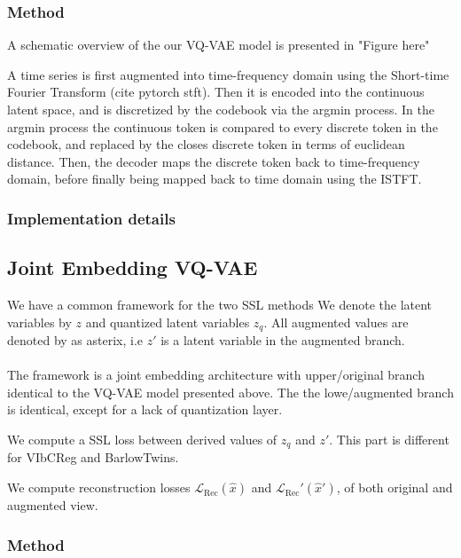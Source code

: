 \documentclass[../../thesis.tex]{subfiles}
\begin{document}
\subsubsection{Method}
A schematic overview of the our VQ-VAE model is presented in "Figure here"\newline

A time series is first augmented into time-frequency domain using the Short-time Fourier Transform (cite pytorch stft). Then it is encoded into the continuous latent space, and is discretized by the codebook via the argmin process. In the argmin process the continuous token is compared to every discrete token in the codebook, and replaced by the closes discrete token in terms of euclidean distance. Then, the decoder maps the discrete token back to time-frequency domain, before finally being mapped back to time domain using the ISTFT.




\subsubsection{Implementation details}


\subsection{Joint Embedding VQ-VAE}
We have a common framework for the two SSL methods\newline
We denote the latent variables by $z$ and quantized latent variables $z_q$. All augmented values are denoted by as asterix, i.e $z'$ is a latent variable in the augmented branch. \\\\


The framework is a joint embedding architecture with upper/original branch identical to the VQ-VAE model presented above. The the lowe/augmented branch is identical, except for a lack of quantization layer. 

We compute a SSL loss between derived values of $z_q$ and $z'$. This part is different for VIbCReg and BarlowTwins.  

We compute reconstruction losses $\mathcal{L}_{\text{Rec}}(\hat{x})$ and $\mathcal{L}_{\text{Rec}}'(\hat{x}')$, of both original and augmented view. 


\subsubsection{Method}
\end{document}

